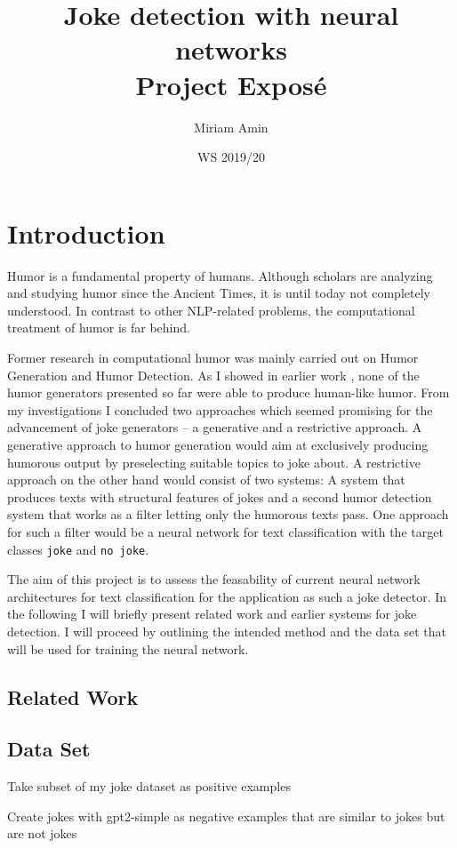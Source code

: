 \documentclass[12pt]{scrartcl}
\title{%
	Joke detection with neural networks \\
	\large Project Exposé}
\author{Miriam Amin}
\date{WS 2019/20}
\begin{document}
\maketitle
\tableofcontents

\section{Introduction}
Humor is a fundamental property of humans. Although scholars are analyzing and studying humor since the Ancient Times, it is until today not completely understood. In contrast to other NLP-related problems, the computational treatment of humor is far behind. 

Former research in computational humor was mainly carried out on Humor Generation and Humor Detection. As I showed in earlier work \citep{aminComputationalHumorAutomatic2019}, none of the humor generators presented so far were able to produce human-like humor. From my investigations I concluded two approaches which seemed promising for the advancement of joke generators -- a generative and a restrictive approach. A generative approach to humor generation would aim at exclusively producing humorous output by preselecting suitable topics to joke about. A restrictive approach on the other hand would consist of two systems: A system that produces texts with structural features of jokes and a second humor detection system that works as a filter letting only the humorous texts pass.  
One approach for such a filter would be a neural network for text classification with the target classes \texttt{joke} and \texttt{no joke}.

The aim of this project is to assess the feasability of current neural network architectures for text classification for the application as such a joke detector. In the following I will briefly present related work and earlier systems for joke detection. I will proceed by outlining the intended method and the data set that will be used for training the neural network. 

 
 \cite{aminComputationalHumorAutomatic2019}

\subsection{Related Work}
\subsection{Data Set}
Take subset of my joke dataset as positive examples


Create jokes with gpt2-simple as negative examples that are similar to jokes but are not jokes
\subsection{}



\end{document}
